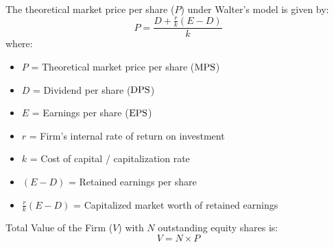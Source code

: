 \begin{formulabox}
The theoretical market price per share ($P$) under Walter's model is given by:
\begin{equation}
    P = \frac{D + \frac{r}{k}(E - D)}{k}
\end{equation}
where:
\begin{itemize}[noitemsep]
    \item $P$ = Theoretical market price per share ($\operatorname{MPS}$)
    \item $D$ = Dividend per share ($\operatorname{DPS}$)
    \item $E$ = Earnings per share ($\operatorname{EPS}$)
    \item $r$ = Firm's internal rate of return on investment
    \item $k$ = Cost of capital / capitalization rate
    \item $(E - D)$ = Retained earnings per share
    \item $\frac{r}{k}(E - D)$ = Capitalized market worth of retained earnings
\end{itemize}
Total Value of the Firm ($V$) with $N$ outstanding equity shares is:
\begin{equation}
    V = N \times P
\end{equation}
\end{formulabox}

